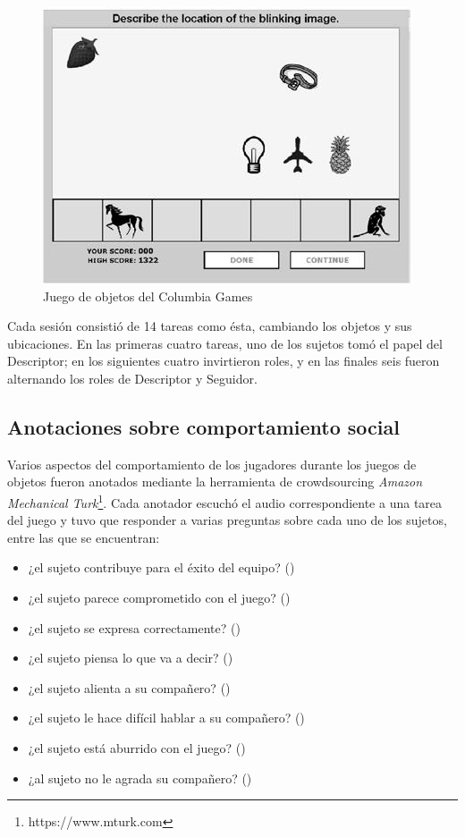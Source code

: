 \begin{figure}
\centering
\includegraphics[scale=0.5]{images/columbia_games.jpg}
\caption{Juego de objetos del Columbia Games}
\label{objects_game}
\end{figure}


Cada sesión consistió de 14 tareas como ésta, cambiando los objetos y sus ubicaciones. En las primeras cuatro tareas, uno de los sujetos tomó el papel del Descriptor; en los siguientes cuatro invirtieron roles, y en las finales seis fueron alternando los roles de Descriptor y Seguidor.

\subsection{Anotaciones sobre comportamiento social}

Varios aspectos del comportamiento de los jugadores durante los juegos de objetos fueron anotados mediante la herramienta de crowdsourcing \emph{Amazon Mechanical Turk}\footnote{https://www.mturk.com}. Cada anotador escuchó el audio correspondiente a una tarea del juego y tuvo que responder a varias preguntas sobre cada uno de los sujetos, entre las que se encuentran:

\begin{itemize}
  \item ¿el sujeto contribuye para el éxito del equipo?  (\svcontributes)
  \item ¿el sujeto parece comprometido con el juego? (\svengaged)
  \item ¿el sujeto se expresa correctamente? (\svclear)
  \item ¿el sujeto piensa lo que va a decir? (\svplanning)
  \item ¿el sujeto alienta a su compañero? (\svencourages)
  \item ¿el sujeto le hace difícil hablar a su compañero? (\svdifficult)
  \item ¿el sujeto está aburrido con el juego? (\svbored)
  \item ¿al sujeto no le agrada su compañero? (\svdislikes)
\end{itemize}


